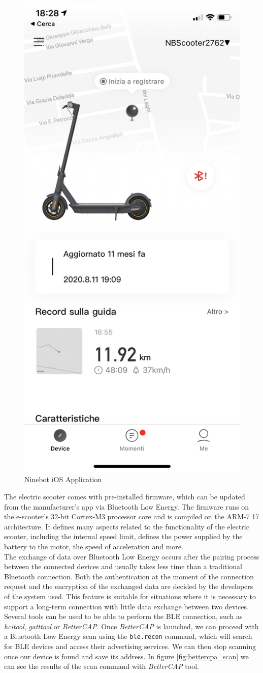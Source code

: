 \documentclass[binding=0.6cm,LaM,noexaminfo]{sapthesis}
\begin{document}
\begin{figure}[!htp]
    \centering
    \includegraphics[width = .3\textwidth]{images/ninebot_app.jpeg}
    \caption{Ninebot iOS Application}
    \label{fig:app_screen}
\end{figure}

\noindent The electric scooter comes with pre-installed firmware, which can be updated from the manufacturer's app via Bluetooth Low Energy. The firmware runs on the e-scooter's 32-bit Cortex-M3 processor core and is compiled on the ARM-7 17 architecture. It defines many aspects related to the functionality of the electric scooter, including the internal speed limit, defines the power supplied by the battery to the motor, the speed of acceleration and more.\\

\noindent The exchange of data over Bluetooth Low Energy occurs after the pairing process between the connected devices and usually takes less time than a traditional Bluetooth connection. Both the authentication at the moment of the connection request and the encryption of the exchanged data are decided by the developers of the system used. This feature is suitable for situations where it is necessary to support a long-term connection with little data exchange between two devices.
Several tools can be used to be able to perform the BLE connection, such as \textit{hcitool}, \textit{gatttool} or \textit{BetterCAP}. Once \textit{BetterCAP} is launched, we can proceed with a Bluetooth Low Energy scan using the \lstinline[basicstyle=\ttfamily, language=bash]|ble.recon| command, which will search for BLE devices and access their advertising services. We can then stop scanning once our device is found and save its address. In figure \ref{fig:bettercpa_scan} we can see the results of the scan command with \textit{BetterCAP} tool.
\end{document}
